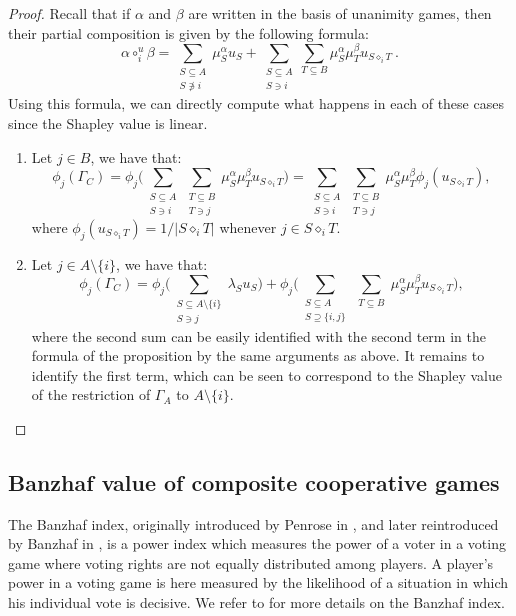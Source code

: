\documentclass[a4paper,12pt]{amsart}
\begin{document}
\begin{proof}
Recall that if $\alpha$ and $\beta$ are written in the basis of unanimity games, then their partial composition is given by the following formula:
\[
\alpha \circ_i^{u} \beta = \sum_{\substack{S \subseteq A \\ S \not \ni i}} \mu^\alpha_S u_S + \sum_{\substack{S \subseteq A \\ S \ni i}} \sum_{T \subseteq B} \mu^\alpha_S \mu^\beta_T u_{S \diamond_i T}~.
\]
Using this formula, we can directly compute what happens in each of these cases since the Shapley value is linear.  

\begin{enumerate}
    \item Let $j \in B$, we have that:
    	\[
    	\phi_j \left( \Gamma_C \right) = \phi_j \Bigg( \sum_{\substack{S \subseteq A \\ S \ni i}} \sum_{\substack{T \subseteq B \\ T \ni j}} \mu^\alpha_S \mu^\beta_T u_{S \diamond_i T} \Bigg) = \sum_{\substack{S \subseteq A \\ S \ni i}} \sum_{\substack{T \subseteq B \\ T \ni j}} \mu^\alpha_S \mu^\beta_T \phi_j \left( u_{S \diamond_i T}\right), 
    	\] 
    	where $\phi_j\left(u_{S \diamond_i T} \right) = 1/ \lvert S \diamond_i T \rvert$ whenever \(j \in S \diamond_i T\).
    	
    	\medskip
    	
    	\item Let $j \in A \setminus \{i \}$, we have that:
    \[
    	\phi_j \left( \Gamma_C \right) = \phi_j \Bigg( \sum_{\substack{S \subseteq A \setminus \{i\} \\ S \ni j}} \lambda_S u_S \Bigg) + \phi_j \Bigg( \sum_{\substack{S \subseteq A \\ S \supseteq \{i,j\}}} \sum_{\substack{T \subseteq B}} \mu^\alpha_S \mu^\beta_T u_{S \diamond_i T} \Bigg),
    	\] 
    	where the second sum can be easily identified with the second term in the formula of the proposition by the same arguments as above. It remains to identify the first term, which can be seen to correspond to the Shapley value of the restriction of $\Gamma_A$ to $A \setminus \{i\}$.   	
\end{enumerate}
\end{proof}

\subsection{Banzhaf value of composite cooperative games} The Banzhaf index, originally introduced by Penrose in \cite{Penrose}, and later reintroduced by Banzhaf in \cite{banzhaf1968one}, is a power index which measures the power of a voter in a voting game where voting rights are not equally distributed among players. A player's power in a voting game is here measured by the likelihood of a situation in which his individual vote is decisive. We refer to \cite{banzhaf1968one, OwenMultilinear, coleman2012control} for more details on the Banzhaf index. 
\end{document}
